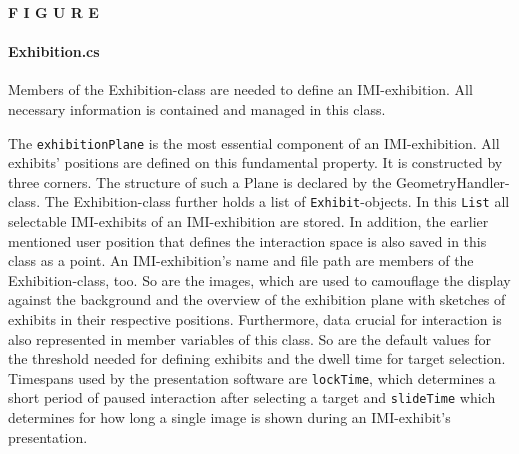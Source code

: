 \textbf{F I G U R E}


%

\paragraph{Exhibition.cs} Members of the Exhibition-class are needed to define an \ac{IMI}-exhibition. All necessary information is contained and managed in this class.

The \texttt{exhibitionPlane} is the most essential component of an \ac{IMI}-exhibition. All exhibits' positions are defined on this fundamental property. It is constructed by three corners. The structure of such a Plane is declared by the GeometryHandler-class. The Exhibition-class further holds a list of \texttt{Exhibit}-objects. In this \texttt{List} all selectable \ac{IMI}-exhibits of an \ac{IMI}-exhibition are stored. In addition, the earlier mentioned user position that defines the interaction space is also saved in this class as a point. An \ac{IMI}-exhibition's name and file path are members of the Exhibition-class, too. So are the images, which are used to camouflage the display against the background and the overview of the exhibition plane with sketches of exhibits in their respective positions. Furthermore, data crucial for interaction is also represented in member variables of this class. So are the default values for the threshold needed for defining exhibits and the dwell time for target selection. Timespans used by the presentation software are \texttt{lockTime}, which determines a short period of paused interaction after selecting a target and \texttt{slideTime} which determines for how long a single image is shown during an \ac{IMI}-exhibit's presentation.

